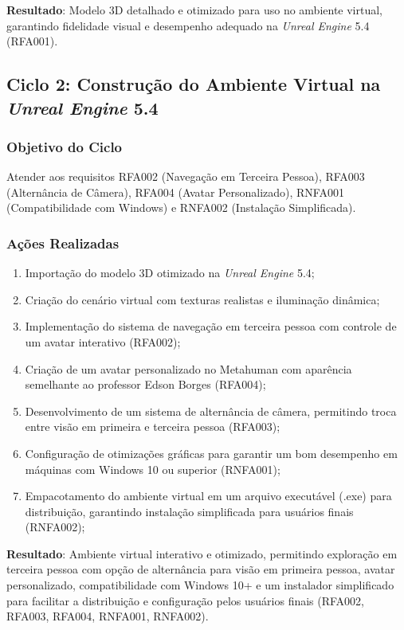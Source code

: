 \textbf{Resultado}: Modelo 3D detalhado e otimizado para uso no ambiente virtual, garantindo fidelidade visual e desempenho adequado na \textit{Unreal Engine} 5.4 (RFA001).

\subsection*{Ciclo 2: Construção do Ambiente Virtual na \textit{Unreal Engine} 5.4} \label{subsec:ciclo2}

\subsubsection*{Objetivo do Ciclo}
Atender aos requisitos RFA002 (Navegação em Terceira Pessoa), RFA003 (Alternância de Câmera), RFA004 (Avatar Personalizado), RNFA001 (Compatibilidade com Windows) e RNFA002 (Instalação Simplificada).

\subsubsection*{Ações Realizadas}
\begin{enumerate}
    \item Importação do modelo 3D otimizado na \textit{Unreal Engine} 5.4;
    \item Criação do cenário virtual com texturas realistas e iluminação dinâmica;
    \item Implementação do sistema de navegação em terceira pessoa com controle de um avatar interativo (RFA002);
    \item Criação de um avatar personalizado no Metahuman com aparência semelhante ao professor Edson Borges (RFA004);
    \item Desenvolvimento de um sistema de alternância de câmera, permitindo troca entre visão em primeira e terceira pessoa (RFA003);
    \item Configuração de otimizações gráficas para garantir um bom desempenho em máquinas com Windows 10 ou superior (RNFA001);
    \item Empacotamento do ambiente virtual em um arquivo executável (.exe) para distribuição, garantindo instalação simplificada para usuários finais (RNFA002);
\end{enumerate}

\textbf{Resultado}: Ambiente virtual interativo e otimizado, permitindo exploração em terceira pessoa com opção de alternância para visão em primeira pessoa, avatar personalizado, compatibilidade com Windows 10+ e um instalador simplificado para facilitar a distribuição e configuração pelos usuários finais (RFA002, RFA003, RFA004, RNFA001, RNFA002).

